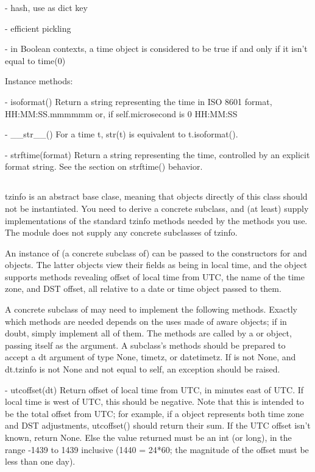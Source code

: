{    - hash, use as dict key

    - efficient pickling

    - in Boolean contexts, a time object is considered to be true
      if and only if it isn't equal to time(0)

Instance methods:

  - isoformat()
    Return a string representing the time in ISO 8601 format,
        HH:MM:SS.mmmmmm
    or, if self.microsecond is 0
        HH:MM:SS

  - __str__()
    For a time t, str(t) is equivalent to t.isoformat().

  - strftime(format)
    Return a string representing the time, controlled by an explicit
    format string.  See the section on strftime() behavior.


\subsection{ \label{datetime-tzinfo}}

tzinfo is an abstract base clase, meaning that objects directly of this
class should not be instantiated.  You need to derive a concrete
subclass, and (at least) supply implementations of the standard tzinfo
methods needed by the  methods you use. The  module does
not supply any concrete subclasses of tzinfo.

An instance of (a concrete subclass of)  can be passed to the
constructors for  and  objects.  The latter objects
view their fields as being in local time, and the  object supports
methods revealing offset of local time from UTC, the name of the time
zone, and DST offset, all relative to a date or time object passed
to them.

A concrete subclass of  may need to implement the following
methods.  Exactly which methods are needed depends on the uses made
of aware  objects; if in doubt, simply implement all of them.
The methods are called by a  or  object, passing itself
as the argument.  A  subclass's methods should be prepared to
accept a dt argument of type None, timetz, or datetimetz.  If is not
None, and dt.tzinfo is not None and not equal to self, an exception
should be raised.

  - utcoffset(dt)
    Return offset of local time from UTC, in minutes east of UTC.  If
    local time is west of UTC, this should be negative.  Note that this
    is intended to be the total offset from UTC; for example, if a
     object represents both time zone and DST adjustments,
    utcoffset() should return their sum.  If the UTC offset isn't known,
    return None.  Else the value returned must be an int (or long), in
    the range -1439 to 1439 inclusive (1440 = 24*60; the magnitude of
    the offset must be less than one day).

}
